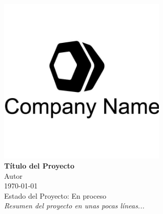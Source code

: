 \documentclass[12pt,twoside,openany]{book}
\begin{document}
	
	\begin{titlepage}
		\centering
		\includegraphics[width=0.6\textwidth]{hexagon-logo.jpg}\\[3cm]
		{\Huge \textbf{Título del Proyecto}}\\[1cm]
		{\Large Autor}\\[1cm]
		{\large \today}\\[1cm]
		{\large Estado del Proyecto: En proceso}\\[2cm] %
		
		\vfill
		\textit{Resumen del proyecto en unas pocas líneas...} %
		\vfill
	\end{titlepage}
	
	\tableofcontents
	
	
	
	
	
	
	
	
	
	
	
	
	
	
	
	
	
\end{document}

